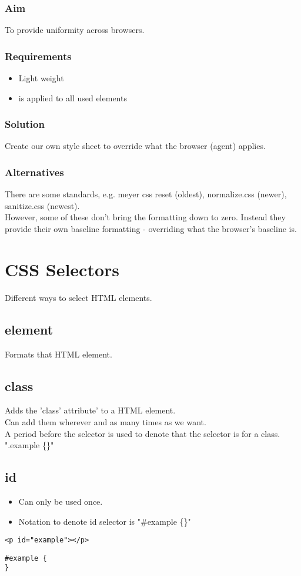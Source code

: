\documentclass[]{article}
\begin{document}
\subsubsection{Aim}
To provide uniformity across browsers.
\subsubsection{Requirements}
\begin{itemize}
	\item Light weight
	\item is applied to all used elements
\end{itemize}
\subsubsection{Solution}
Create our own style sheet to override what the browser (agent) applies.
\subsubsection{Alternatives}
There are some standards, e.g. meyer css reset (oldest), normalize.css (newer), sanitize.css (newest).  
\\
However, some of these don't bring the formatting down to zero.  Instead they provide their own baseline formatting - overriding what the browser's baseline is.

\section{CSS Selectors}
Different ways to select HTML elements.
\subsection{element}
Formats that HTML element.
\subsection{class}
Adds the 'class' attribute' to a HTML element.
\\
Can add them wherever and as many times as we want.
\\
A period before the selector is used to denote that the selector is for a class. ".example \{\}"

\subsection{id}
\begin{itemize}
	\item Can only be used once.
	\item Notation to denote id selector is "\#example \{\}" 
\end{itemize}
\begin{lstlisting}
<p id="example"></p>
\end{lstlisting}
\begin{lstlisting}
#example {
}
\end{lstlisting}
\end{document}
